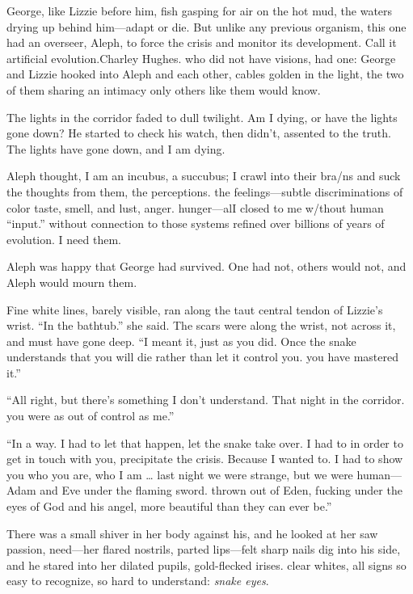 George, like Lizzie before him, fish gasping for air on the hot mud, the waters drying up behind him—adapt or die. But unlike any previous organism, this one had an overseer, Aleph, to force the crisis and monitor its development. Call it artificial evolution.Charley Hughes. who did not have visions, had one: George and Lizzie hooked into Aleph and each other, cables golden in the light, the two of them sharing an intimacy only others like them would know.

The lights in the corridor faded to dull twilight. Am I dying, or have the lights gone down? He started to check his watch, then didn’t, assented to the truth. The lights have gone down, and I am dying.

Aleph thought, I am an incubus, a succubus; I crawl into their bra/ns and suck the thoughts from them, the perceptions. the feelings—subtle discriminations of color taste, smell, and lust, anger. hunger—alI closed to me w/thout human “input.” without connection to those systems refined over billions of years of evolution. I need them.

Aleph was happy that George had survived. One had not, others would not, and Aleph would mourn them.

Fine white lines, barely visible, ran along the taut central tendon of Lizzie’s wrist. “In the bathtub.” she said. The scars were along the wrist, not across it, and must have gone deep. “I meant it, just as you did. Once the snake understands that you will die rather than let it control you. you have mastered it.”

“All right, but there’s something I don’t understand. That night in the corridor. you were as out of control as me.”

“In a way. I had to let that happen, let the snake take over. I had to in order to get in touch with you, precipitate the crisis. Because I wanted to. I had to show you who you are, who I am … last night we were strange, but we were human—Adam and Eve under the flaming sword. thrown out of Eden, fucking under the eyes of God and his angel, more beautiful than they can ever be.”

There was a small shiver in her body against his, and he looked at her saw passion, need—her flared nostrils, parted lips—felt sharp nails dig into his side, and he stared into her dilated pupils, gold-flecked irises. clear whites, all signs so easy to recognize, so hard to understand: \textit{snake eyes}.     
